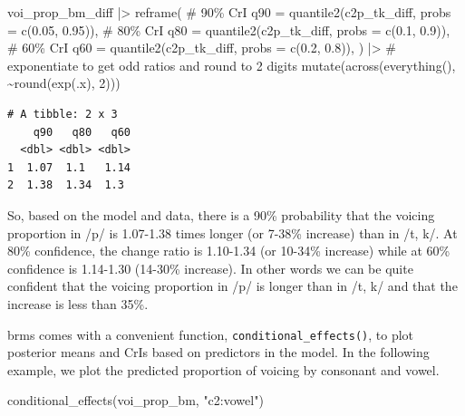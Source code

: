 \documentclass[
  authoryear,
  preprint,
  3p]{elsarticle}
\newenvironment{Shaded}{\begin{snugshade}}{\end{snugshade}}
\newcommand{\AttributeTok}[1]{\textcolor[rgb]{0.40,0.45,0.13}{#1}}
\newcommand{\CommentTok}[1]{\textcolor[rgb]{0.37,0.37,0.37}{#1}}
\newcommand{\DecValTok}[1]{\textcolor[rgb]{0.68,0.00,0.00}{#1}}
\newcommand{\FloatTok}[1]{\textcolor[rgb]{0.68,0.00,0.00}{#1}}
\newcommand{\FunctionTok}[1]{\textcolor[rgb]{0.28,0.35,0.67}{#1}}
\newcommand{\NormalTok}[1]{\textcolor[rgb]{0.00,0.23,0.31}{#1}}
\newcommand{\SpecialCharTok}[1]{\textcolor[rgb]{0.37,0.37,0.37}{#1}}
\newcommand{\StringTok}[1]{\textcolor[rgb]{0.13,0.47,0.30}{#1}}
\begin{document}
\begin{Shaded}
\begin{Highlighting}[]
\NormalTok{voi\_prop\_bm\_diff }\SpecialCharTok{|\textgreater{}} 
  \FunctionTok{reframe}\NormalTok{(}
    \CommentTok{\# 90\% CrI}
    \AttributeTok{q90 =} \FunctionTok{quantile2}\NormalTok{(c2p\_tk\_diff, }\AttributeTok{probs =} \FunctionTok{c}\NormalTok{(}\FloatTok{0.05}\NormalTok{, }\FloatTok{0.95}\NormalTok{)),}
    \CommentTok{\# 80\% CrI}
    \AttributeTok{q80 =} \FunctionTok{quantile2}\NormalTok{(c2p\_tk\_diff, }\AttributeTok{probs =} \FunctionTok{c}\NormalTok{(}\FloatTok{0.1}\NormalTok{, }\FloatTok{0.9}\NormalTok{)),}
    \CommentTok{\# 60\% CrI}
    \AttributeTok{q60 =} \FunctionTok{quantile2}\NormalTok{(c2p\_tk\_diff, }\AttributeTok{probs =} \FunctionTok{c}\NormalTok{(}\FloatTok{0.2}\NormalTok{, }\FloatTok{0.8}\NormalTok{)),}
\NormalTok{  ) }\SpecialCharTok{|\textgreater{}} 
  \CommentTok{\# exponentiate to get odd ratios and round to 2 digits}
  \FunctionTok{mutate}\NormalTok{(}\FunctionTok{across}\NormalTok{(}\FunctionTok{everything}\NormalTok{(), }\SpecialCharTok{\textasciitilde{}}\FunctionTok{round}\NormalTok{(}\FunctionTok{exp}\NormalTok{(.x), }\DecValTok{2}\NormalTok{)))}
\end{Highlighting}
\end{Shaded}

\begin{verbatim}
# A tibble: 2 x 3
    q90   q80   q60
  <dbl> <dbl> <dbl>
1  1.07  1.1   1.14
2  1.38  1.34  1.3 
\end{verbatim}

So, based on the model and data, there is a 90\% probability that the
voicing proportion in /p/ is 1.07-1.38 times longer (or 7-38\% increase)
than in /t, k/. At 80\% confidence, the change ratio is 1.10-1.34 (or
10-34\% increase) while at 60\% confidence is 1.14-1.30 (14-30\%
increase). In other words we can be quite confident that the voicing
proportion in /p/ is longer than in /t, k/ and that the increase is less
than 35\%.

brms comes with a convenient function, \texttt{conditional\_effects()},
to plot posterior means and CrIs based on predictors in the model. In
the following example, we plot the predicted proportion of voicing by
consonant and vowel.

\begin{Shaded}
\begin{Highlighting}[]
\FunctionTok{conditional\_effects}\NormalTok{(voi\_prop\_bm, }\StringTok{"c2:vowel"}\NormalTok{)}
\end{Highlighting}
\end{Shaded}
\end{document}
